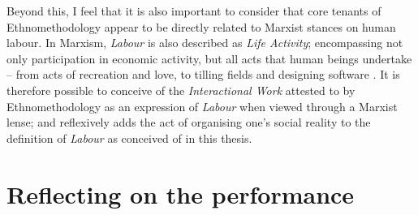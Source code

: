Beyond this, I feel that it is also important to consider that core tenants of Ethnomethodology appear to be directly related to Marxist stances on human labour. In Marxism, \textit{Labour} is also described as \textit{Life Activity}; encompassing not only participation in economic activity, but all acts that human beings undertake -- from acts of recreation and love, to tilling fields and designing software \cite{marx_economic_1844, mitchell_i_2013}. It is therefore possible to conceive of the \textit{Interactional Work} attested to by Ethnomethodology \cite{garfinkel_ethnomethodological_2005, crabtree_doing_2012} as an expression of \textit{Labour} when viewed through a Marxist lense; and reflexively adds the act of organising one's social reality to the definition of \textit{Labour} as conceived of in this thesis.



\section{Reflecting on the performance}

